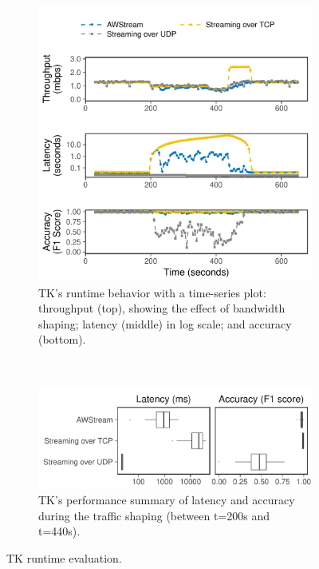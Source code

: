 \documentclass[twocolumn, 9pt]{article}
\begin{document}
\begin{figure}[t]
  \begin{subfigure}[t]{\columnwidth}
    \centering
    \includegraphics[width=\columnwidth]{figures/runtime_tk-timeseries.pdf}
    \caption{TK's runtime behavior with a time-series plot: throughput (top),
      showing the effect of bandwidth shaping; latency (middle) in log scale;
      and accuracy (bottom).}
    \label{fig:tk-runtime-timeseries}
  \end{subfigure}
  \vspace{1em}
  \\
  \begin{subfigure}[t]{\columnwidth}
    \centering
    \includegraphics[width=\columnwidth]{figures/runtime_tk-boxplot.pdf}
    \caption{TK's performance summary of latency and accuracy during the traffic
      shaping (between t=200s and t=440s).}
    \label{fig:tk-runtime-boxplot}
  \end{subfigure}
  \caption{TK runtime evaluation.}
  \label{fig:tk-runtime}
\end{figure}
\end{document}
